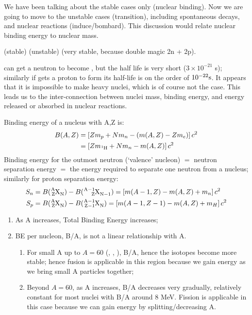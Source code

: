 \documentclass{school-22.101-notes}
\begin{document}
We have been talking about the stable cases only (nuclear binding). Now we are going to move to the unstable cases (transition), including spontaneous decays, and nuclear reactions (induce/bombard). This discussion would relate nuclear binding energy to nuclear mass. 

 (stable)   (unstable)  (very stable, because double magic 2n + 2p). 

 can get a neutron to become , but the half life is very short ($3 \times 10^{-21}$ s); similarly if  gets a proton to form  its half-life is on the order of $10^{-22} \mathrm{s}$. It appears that it is impossible to make heavy nuclei, which is of course not the case. This leads us to the inter-connection between nuclei mass, binding energy, and energy released or absorbed in nuclear reactions.

Binding energy of a nucleus with A,Z is:
\begin{align} 
B(A,Z) &= \left[ Z m_p + N m_n - (m(A,Z) - Z m_e) \right] c^2 \\
&= \left[ Z m_{\ce{^1 H}} + N m_n - m(A,Z) \right] c^2
\end{align}
Binding energy for the outmost neutron (`valence' nucleon) $=$ neutron separation energy $=$ the energy required to separate one neutron from a nucleus; similarly for proton separation energy: 
\begin{align}
S_n &= B(\ce{^A_Z X_N}) -B(\ce{^{A-1}_Z X_{N-1}}) = \left[ m(A-1, Z) - m(A,Z) + m_n \right] c^2 \\
S_p &= B(\ce{^A_Z X_N}) -B(\ce{^{A-1}_{Z-1} X_{N}}) = \left[ m(A-1, Z-1) - m(A,Z) + m_{H} \right] c^2
\end{align}

\begin{enumerate}
\item As A increases, Total Binding Energy increases; 
\item BE per nucleon, B/A, is not a linear relationship with A.
    \begin{enumerate}
    \item For small A up to $A = 60$ (, , ), B/A, hence the isotopes become more stable; hence fusion is applicable in this region because we gain energy as we bring small A particles together; 
    \item Beyond $A = 60$, as A increases, B/A decreases very gradually, relatively constant for most nuclei with B/A around 8 MeV. Fission is applicable in this case because we can gain energy by splitting/decreasing A. 
    \end{enumerate}  
\end{enumerate}
\end{document}
